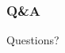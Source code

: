 \documentclass{beamer}
\begin{document}
\begin{frame}
\frametitle{Q\&A}
	Questions?
\end{frame}

% 
\end{document}
